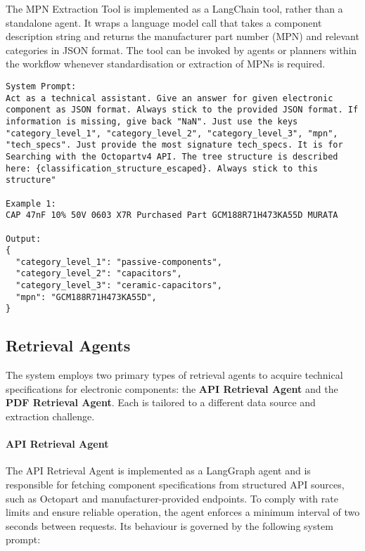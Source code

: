 The MPN Extraction Tool is implemented as a LangChain tool, rather than a standalone agent. It wraps a language model call that takes a component description string and returns the manufacturer part number (MPN) and relevant categories in JSON format. The tool can be invoked by agents or planners within the workflow whenever standardisation or extraction of MPNs is required.

\begin{lstlisting}[caption={System prompt, user prompt, and output for the MPN Extraction Tool using the tagging prompt.}, label={lst:mpn_schema}, breaklines=true]
System Prompt:
Act as a technical assistant. Give an answer for given electronic component as JSON format. Always stick to the provided JSON format. If information is missing, give back "NaN". Just use the keys "category_level_1", "category_level_2", "category_level_3", "mpn", "tech_specs". Just provide the most signature tech_specs. It is for Searching with the Octopartv4 API. The tree structure is described here: {classification_structure_escaped}. Always stick to this structure"

Example 1:
CAP 47nF 10% 50V 0603 X7R Purchased Part GCM188R71H473KA55D MURATA

Output:
{
  "category_level_1": "passive-components",
  "category_level_2": "capacitors",
  "category_level_3": "ceramic-capacitors",
  "mpn": "GCM188R71H473KA55D",
}
\end{lstlisting}

\subsection{Retrieval Agents}

The system employs two primary types of retrieval agents to acquire technical specifications for electronic components: the \textbf{API Retrieval Agent} and the \textbf{PDF Retrieval Agent}. Each is tailored to a different data source and extraction challenge.

\paragraph{API Retrieval Agent}
The API Retrieval Agent is implemented as a LangGraph agent and is responsible for fetching component specifications from structured API sources, such as Octopart and manufacturer-provided endpoints. To comply with rate limits and ensure reliable operation, the agent enforces a minimum interval of two seconds between requests. Its behaviour is governed by the following system prompt:

